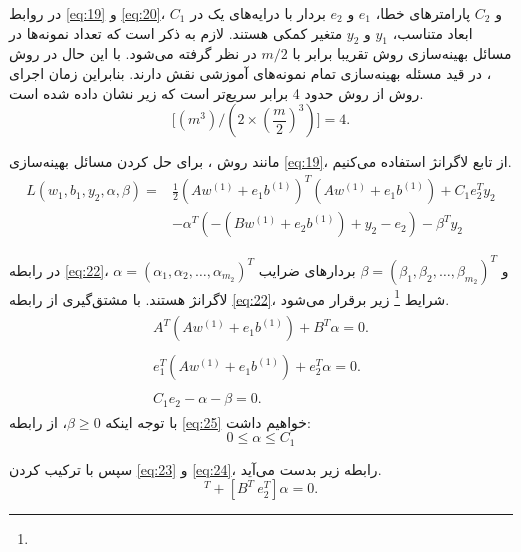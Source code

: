 \bigbreak
در روابط \ref{eq:19} و \ref{eq:20}،  $C_1$ و $C_2$  پارامترهای خطا،  $e_1$ و  $e_2$ بردار با درایه‌های یک در ابعاد متناسب،  $y_1$ و $y_2$  متغیر کمکی هستند. لازم به ذکر است که تعداد نمونه‌ها در مسائل بهینه‌سازی روش  تقریبا برابر با $m/2$ در نظر گرفته می‌شود. با این حال در روش ، در قید مسئله بهینه‌سازی تمام نمونه‌های آموزشی نقش دارند. بنابراین زمان اجرای روش  از روش  حدود 4 برابر سریع‌تر است که زیر نشان داده شده است.
\begin{equation}
\Big[({{m}^{3}})/(2\times {{(\frac{m}{2})}^{3}})\Big] = 4.
\label{eq:21}
\end{equation}

مانند روش ، برای حل کردن مسائل بهینه‌سازی \ref{eq:19}، از تابع لاگرانژ استفاده می‌کنیم.
\begin{equation}
\begin{split}
L(w_{1},b_{1},y_{2}, \alpha, \beta )= &\frac{1}{2}(A{{w}^{(1)}}+{{e}_{1}}{{b}^{(1)}})^{T}(A{{w}^{(1)}}+{{e}_{1}}{{b}^{(1)}}) + {{C}_{1}}e_{2}^{T}y_{2} \\
&-\alpha^{T}(-(Bw^{(1)}+e_{2}b^{(1)})+y_{2} - e_{2}) - \beta^{T}y_{2}
\end{split}
\label{eq:22}
\end{equation}

در رابطه \ref{eq:22}، $\alpha=(\alpha_{1}, \alpha_{2}, \dots,\alpha_{m_{2}})^{T}$ و $\beta=(\beta_{1}, \beta_{2}, \dots,\beta_{m_{2}})^{T}$ بردارهای ضرایب لاگرانژ هستند.  با مشتق‌گیری از رابطه \ref{eq:22}، شرایط \footnote{}  زیر برقرار می‌شود.
\begin{align}
\label{eq:23}
\begin{split}
A^{T}(A{{w}^{(1)}}+{{e}_{1}}{{b}^{(1)}}) + B^{T}\alpha = 0.
\end{split} \\
\label{eq:24}
\begin{split}
e_{1}^{T}(A{{w}^{(1)}}+{{e}_{1}}{{b}^{(1)}}) + e_{2}^{T}\alpha = 0.
\end{split}\\
\label{eq:25}
\begin{split}
C_{1}e_{2} - \alpha - \beta = 0.
\end{split} 
\end{align}
با توجه اینکه $\beta \ge 0$، از رابطه \ref{eq:25} خواهیم داشت:
\begin{equation}
0 \le \alpha \le {C}_{1}
\label{eq:26}
\end{equation}

سپس با ترکیب کردن \ref{eq:23} و \ref{eq:24}، رابطه زیر بدست می‌آید.
\begin{equation}
[A^{T}\ e^{T}_{1}][A\ e_{1}][w^{(1)}\ b^{(1)}]^{T} + [B^{T}\ e^{T}_{2}]\alpha = 0.
\label{eq:27}
\end{equation}


